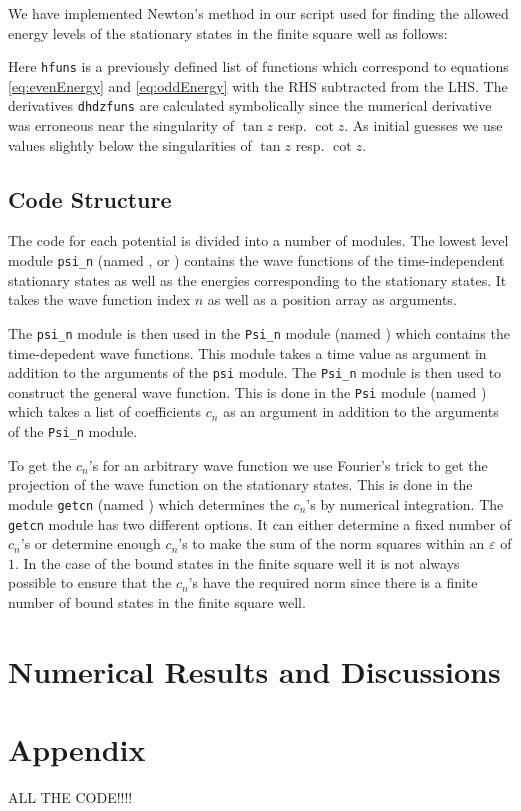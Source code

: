\documentclass[12pt,a4paper]{article}
\renewcommand{\epsilon}{\varepsilon}
\begin{document}
We have implemented Newton's method in our script used for finding the allowed energy levels of the stationary states in the finite square well as follows:

Here \lstinline{hfuns} is a previously defined list of functions which correspond to equations \eqref{eq:evenEnergy} and \eqref{eq:oddEnergy} with the RHS subtracted from the LHS. The derivatives \lstinline{dhdzfuns} are calculated symbolically since the numerical derivative was erroneous near the singularity of $\tan z$ resp. $\cot z$. As initial guesses we use values slightly below the singularities of $\tan z$ resp. $\cot z$.

\subsection{Code Structure}
The code for each potential is divided into a number of modules. The lowest level module \verb!psi_n! (named ,  or ) contains the wave functions of the time-independent stationary states as well as the energies corresponding to the stationary states. It takes the wave function index $n$ as well as a position array as arguments.

The \verb!psi_n! module is then used in the \verb!Psi_n! module (named ) which contains the time-depedent wave functions. This module takes a time value as argument in addition to the arguments of the \verb!psi! module.  The \verb!Psi_n! module is then used to construct the general wave function. This is done in the \verb!Psi! module (named ) which takes a list of coefficients $c_n$ as an argument in addition to the arguments of the \verb!Psi_n! module.

To get the $c_n$'s for an arbitrary wave function we use Fourier's trick to get the projection of the wave function on the stationary states. This is done in the module \verb!getcn! (named ) which determines the $c_n$'s by numerical integration. The \verb!getcn! module has two different options. It can either determine a fixed number of $c_n$'s or determine enough $c_n$'s to make the sum of the norm squares within an $\epsilon$ of $1$. In the case of the bound states in the finite square well it is not always possible to ensure that the $c_n$'s have the required norm since there is a finite number of bound states in the finite square well.

\section{Numerical Results and Discussions}

\section{Appendix}
ALL THE CODE!!!!
\end{document}

